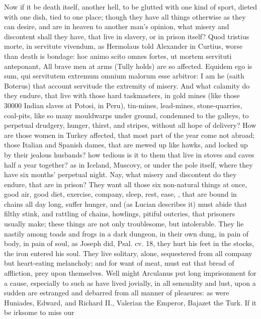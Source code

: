 {Now if it be death itself, another hell, to be glutted with one kind of
sport, dieted with one dish, tied to one place; though they have all
things otherwise as they can desire, and are in heaven to another man's
opinion, what misery and discontent shall they have, that live in
slavery, or in prison itself? Quod tristius morte, in servitute
vivendum, as Hermolaus told Alexander in Curtius, worse than
death is bondage: hoc animo scito omnes fortes, ut mortem
servituti anteponant, All brave men at arms (Tully holds) are so
affected. Equidem ego is sum, qui servitutem extremum omnium
malorum esse arbitror: I am he (saith Boterus) that account servitude
the extremity of misery. And what calamity do they endure, that live
with those hard taskmasters, in gold mines (like those 30\thinspace{}000
Indian slaves at Potosi, in Peru), tin-mines, lead-mines,
stone-quarries, coal-pits, like so many mouldwarps under ground,
condemned to the galleys, to perpetual drudgery, hunger, thirst, and
stripes, without all hope of delivery? How are those women in Turkey
affected, that most part of the year come not abroad; those Italian and
Spanish dames, that are mewed up like hawks, and locked up by their
jealous husbands? how tedious is it to them that live in stoves and
caves half a year together? as in Iceland, Muscovy, or under the
pole itself, where they have six months' perpetual night. Nay,
what misery and discontent do they endure, that are in prison? They
want all those six non-natural things at once, good air, good diet,
exercise, company, sleep, rest, ease, \etc{}, that are bound in chains all
day long, suffer hunger, and (as Lucian describes it) must abide
that filthy stink, and rattling of chains, howlings, pitiful outcries,
that prisoners usually make; these things are not only troublesome, but
intolerable. They lie nastily among toads and frogs in a dark dungeon,
in their own dung, in pain of body, in pain of soul, as Joseph did,
Psal. cv. 18, they hurt his feet in the stocks, the iron entered his
soul. They live solitary, alone, sequestered from all company but
heart-eating melancholy; and for want of meat, must eat that bread of
affliction, prey upon themselves. Well might Arculanus put long
imprisonment for a cause, especially to such as have lived jovially, in
all sensuality and lust, upon a sudden are estranged and debarred from
all manner of pleasures: as were Huniades, Edward, and Richard II.,
Valerian the Emperor, Bajazet the Turk. If it be irksome to miss our
}
